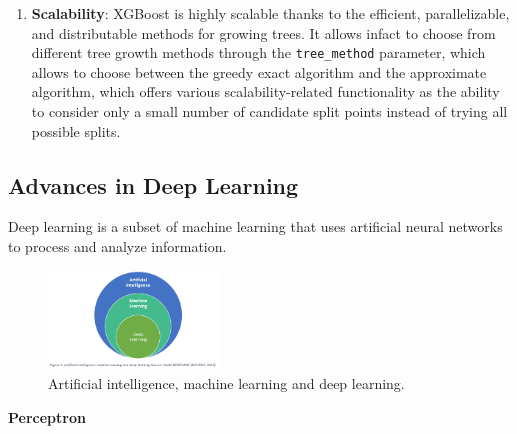 \begin{enumerate}
    \item \textbf{Scalability}: XGBoost is highly scalable thanks to the efficient, parallelizable, and distributable methods for growing trees. It allows infact to choose from different tree growth methods through the \texttt{tree\_method} parameter, which allows to choose between the greedy exact algorithm and the approximate algorithm, which offers various scalability-related functionality as the ability to consider only a small number of candidate split points instead of trying all possible splits. 
        
\end{enumerate} 


\subsection{Advances in Deep Learning} %
Deep learning is a subset of machine learning that uses artificial neural networks to process and analyze information. 
\begin{figure}[H] 
    \centering
    \includegraphics[width=0.4\textwidth]{Machine_learning_thesis/Images/deep learning and machine learning.png}
    \caption{Artificial intelligence, machine learning and deep learning.} 
    \label{fig:Artificial intelligence, machine learning and deep learning} 
\end{figure}

\textbf{Perceptron}

